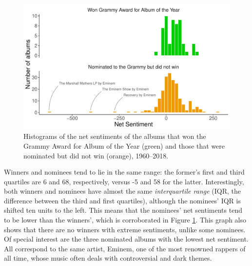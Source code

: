 \documentclass{article}
\begin{document}
\begin{figure}[h]
    \centering
    \includegraphics[scale=0.6]{Plots/graph_net_sentiment_histogram.pdf}
    \caption{Histograms of the net sentiments of the albums that won the Grammy Award for Album of the Year (green) and those that were nominated but did not win (orange), 1960--2018.}
    \label{fig:histogram}
\end{figure}




Winners and nominees tend to lie in the same range: the former's first and third quartiles are 6 and 68, respectively, versus -5 and 58 for the latter. Interestingly, both winners and nominees have almost the same \textit{interquartile range} (IQR, the difference between the third and first quartiles), although the nominees' IQR is shifted ten units to the left. This means that the nominees' net sentiments tend to be lower than the winners', which is corroborated in Figure \ref{fig:histogram}. This graph also shows that there are no winners with extreme sentiments, unlike some nominees. Of special interest are the three nominated albums with the lowest net sentiment. All correspond to the same artist, Eminem, one of the most renowned rappers of all time, whose music often deals with controversial and dark themes. \\






\end{document}
